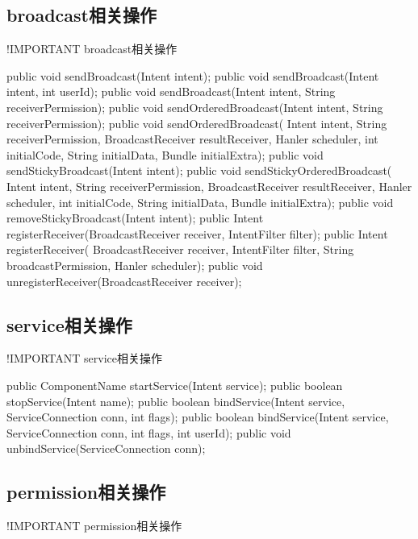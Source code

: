 ﻿\documentclass[a4paper,11pt]{article}
\begin{document}
\subsection[broadcast相关操作]{broadcast相关操作}
!IMPORTANT broadcast相关操作

\begin{javacode}
public void sendBroadcast(Intent intent);
public void sendBroadcast(Intent intent, int userId);
public void sendBroadcast(Intent intent, String receiverPermission);
public void sendOrderedBroadcast(Intent intent, String receiverPermission);
public void sendOrderedBroadcast(
            Intent intent,
            String receiverPermission,
            BroadcastReceiver resultReceiver,
            Hanler scheduler,
            int initialCode,
            String initialData,
            Bundle initialExtra);
public void sendStickyBroadcast(Intent intent);
public void sendStickyOrderedBroadcast(
            Intent intent,
            String receiverPermission,
            BroadcastReceiver resultReceiver,
            Hanler scheduler,
            int initialCode,
            String initialData,
            Bundle initialExtra);
public void removeStickyBroadcast(Intent intent);
public Intent registerReceiver(BroadcastReceiver receiver, IntentFilter filter);
public Intent registerReceiver(
            BroadcastReceiver receiver,
            IntentFilter filter,
            String broadcastPermission,
            Hanler scheduler);
public void unregisterReceiver(BroadcastReceiver receiver);
\end{javacode}

\subsection[service相关操作]{service相关操作}
!IMPORTANT service相关操作

\begin{javacode}
public ComponentName startService(Intent service);
public boolean stopService(Intent name);
public boolean bindService(Intent service, ServiceConnection conn, int flags);
public boolean bindService(Intent service, ServiceConnection conn, int flags, int userId);
public void unbindService(ServiceConnection conn);
\end{javacode}

\subsection[permission相关操作]{permission相关操作}
!IMPORTANT permission相关操作
\end{document}
